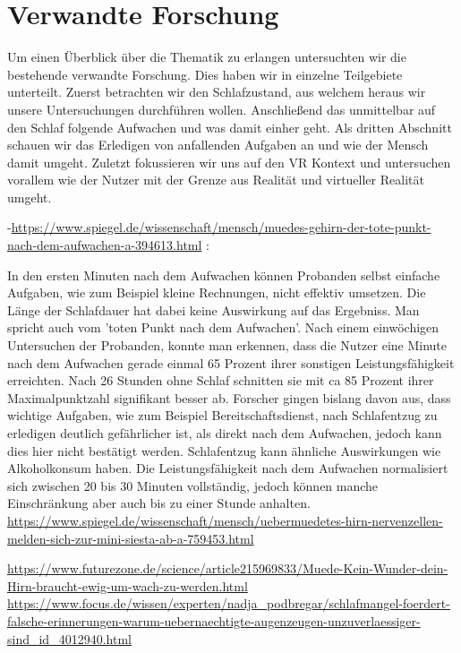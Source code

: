 \chapter{Verwandte Forschung}\label{sec:relatedWork}
Um einen Überblick über die Thematik zu erlangen untersuchten wir die bestehende verwandte Forschung. Dies haben wir in einzelne Teilgebiete unterteilt. Zuerst betrachten wir den Schlafzustand, aus welchem heraus wir unsere Untersuchungen durchführen wollen. Anschließend das unmittelbar auf den Schlaf folgende Aufwachen und was damit einher geht. Als dritten Abschnitt schauen wir das Erledigen von anfallenden Aufgaben an und wie der Mensch damit umgeht. Zuletzt fokussieren wir uns auf den VR Kontext und untersuchen vorallem wie der Nutzer mit der Grenze aus Realität und virtueller Realität umgeht.\\


 -\url{https://www.spiegel.de/wissenschaft/mensch/muedes-gehirn-der-tote-punkt-nach-dem-aufwachen-a-394613.html} :
 
 In den ersten Minuten nach dem Aufwachen können Probanden selbst einfache Aufgaben, wie zum Beispiel kleine Rechnungen, nicht effektiv umsetzen. Die Länge der Schlafdauer hat dabei keine Auswirkung auf das Ergebniss. Man spricht auch vom 'toten Punkt nach dem Aufwachen'. Nach einem einwöchigen Untersuchen der Probanden, konnte man erkennen, dass die Nutzer eine Minute nach dem Aufwachen gerade einmal 65 Prozent ihrer sonstigen Leistungsfähigkeit erreichten. Nach 26 Stunden ohne Schlaf schnitten sie mit ca 85 Prozent ihrer Maximalpunktzahl signifikant besser ab. Forscher gingen bislang davon aus, dass wichtige Aufgaben, wie zum Beispiel Bereitschaftsdienst, nach Schlafentzug zu erledigen deutlich gefährlicher ist, als direkt nach dem Aufwachen, jedoch kann dies hier nicht bestätigt werden.
 Schlafentzug kann ähnliche Auswirkungen wie Alkoholkonsum haben.
 Die Leistungsfähigkeit nach dem Aufwachen normalisiert sich zwischen 20 bis 30 Minuten vollständig, jedoch können manche Einschränkung aber auch bis zu einer Stunde anhalten. \\

\url{https://www.spiegel.de/wissenschaft/mensch/uebermuedetes-hirn-nervenzellen-melden-sich-zur-mini-siesta-ab-a-759453.html}


\url{https://www.futurezone.de/science/article215969833/Muede-Kein-Wunder-dein-Hirn-braucht-ewig-um-wach-zu-werden.html}
\url{https://www.focus.de/wissen/experten/nadja_podbregar/schlafmangel-foerdert-falsche-erinnerungen-warum-uebernaechtigte-augenzeugen-unzuverlaessiger-sind_id_4012940.html}
